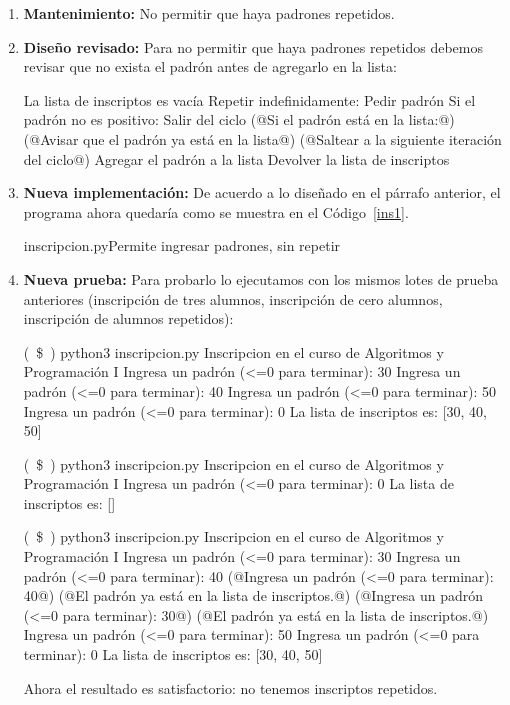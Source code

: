 \begin{enumerate}
Evidentemente el programa funciona de acuerdo a lo especificado, pero
hay algo que no tuvimos en cuenta: permite inscribir a una misma persona
más de una vez.

\item {\bf Mantenimiento:} No permitir que haya padrones repetidos.

\item {\bf Diseño revisado:} Para no permitir que haya padrones repetidos
debemos revisar que no exista el padrón antes de agregarlo en la lista:

\begin{codigo-nohl-sn}
La lista de inscriptos es vacía
Repetir indefinidamente:
    Pedir padrón
    Si el padrón no es positivo:
        Salir del ciclo
    (@Si el padrón está en la lista:@)
        (@Avisar que el padrón ya está en la lista@)
        (@Saltear a la siguiente iteración del ciclo@)
    Agregar el padrón a la lista
Devolver la lista de inscriptos
\end{codigo-nohl-sn}

\item {\bf Nueva implementación:}
De acuerdo a lo diseñado en el párrafo anterior, el programa ahora quedaría
como se muestra en el Código~\ref{ins1}.

\begin{codigo}{inscripcion.py}{Permite ingresar padrones, sin repetir}
\label{ins1}

\end{codigo}

\item {\bf Nueva prueba:}
Para probarlo lo ejecutamos con los mismos lotes de prueba anteriores
(inscripción de tres alumnos, inscripción de cero alumnos, inscripción de
alumnos repetidos):

\begin{codigo-nohl-sn}
(~\$~) python3 inscripcion.py
Inscripcion en el curso de Algoritmos y Programación I
Ingresa un padrón (<=0 para terminar): 30
Ingresa un padrón (<=0 para terminar): 40
Ingresa un padrón (<=0 para terminar): 50
Ingresa un padrón (<=0 para terminar): 0
La lista de inscriptos es: [30, 40, 50]

(~\$~) python3 inscripcion.py
Inscripcion en el curso de Algoritmos y Programación I
Ingresa un padrón (<=0 para terminar): 0
La lista de inscriptos es: []

(~\$~) python3 inscripcion.py
Inscripcion en el curso de Algoritmos y Programación I
Ingresa un padrón (<=0 para terminar): 30
Ingresa un padrón (<=0 para terminar): 40
(@Ingresa un padrón (<=0 para terminar): 40@)
(@El padrón ya está en la lista de inscriptos.@)
(@Ingresa un padrón (<=0 para terminar): 30@)
(@El padrón ya está en la lista de inscriptos.@)
Ingresa un padrón (<=0 para terminar): 50
Ingresa un padrón (<=0 para terminar): 0
La lista de inscriptos es: [30, 40, 50]
\end{codigo-nohl-sn}

Ahora el resultado es satisfactorio: no tenemos inscriptos repetidos.

\end{enumerate}

